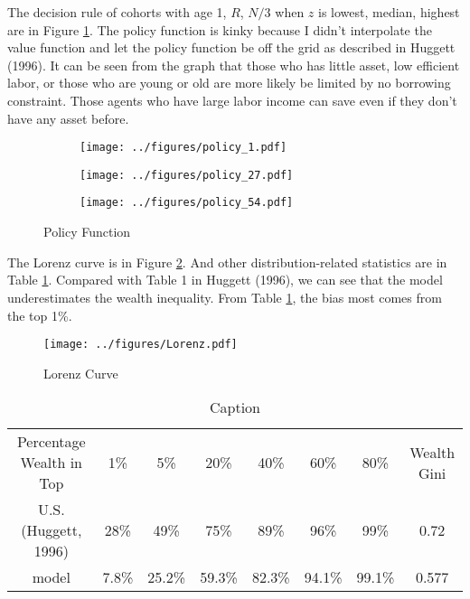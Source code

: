 \documentclass{article}
\begin{document}
	The decision rule of cohorts with age 1, $R$, $N/3$ when $z$ is lowest, median, highest are in Figure \ref{fig:rule}.
	The policy function is kinky because I didn't interpolate the value function and let the policy function be off the grid as described in Huggett (1996).
	It can be seen from the graph that those who has little asset, low efficient labor, or those who are young or old are more likely be limited by no borrowing constraint.
	Those agents who have large labor income can save even if they don't have any asset before.
	
	\begin{figure}[h]
		\centering
		\begin{subfigure}{0.32\textwidth}
			\texttt{[image: ../figures/policy\_1.pdf]}
		\end{subfigure}
		\begin{subfigure}{0.32\textwidth}
			\texttt{[image: ../figures/policy\_27.pdf]}
		\end{subfigure}
		\begin{subfigure}{0.32\textwidth}
			\texttt{[image: ../figures/policy\_54.pdf]}
		\end{subfigure}
		\caption{Policy Function}
		\label{fig:rule}
	\end{figure}
	
	The Lorenz curve is in Figure \ref{fig:lorenz}.
	And other distribution-related statistics are in Table \ref{tab:gini}.
	Compared with Table 1 in Huggett (1996), we can see that the model underestimates the wealth inequality.
	From Table \ref{tab:gini}, the bias most comes from the top 1\%.
	
	\begin{figure}[h]
		\centering
		\texttt{[image: ../figures/Lorenz.pdf]}
		\caption{Lorenz Curve}
		\label{fig:lorenz}
	\end{figure}
	
	\begin{table}[h]
		\centering
		\begin{tabular}{c|c|c|c|c|c|c|c}
			Percentage Wealth in Top & 1\% & 5\% & 20\% & 40\% & 60\% & 80\% & Wealth Gini\\
			U.S. (Huggett, 1996) & 28\% & 49\% & 75\% & 89\% & 96\% & 99\% & 0.72\\
			model & 7.8\% & 25.2\% & 59.3\% & 82.3\% & 94.1\% & 99.1\% & 0.577
		\end{tabular}
		\caption{Caption}
		\label{tab:gini}
	\end{table}
	
\end{document}
